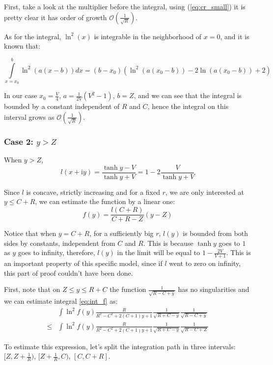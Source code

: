 \documentclass{gCOV2e}
\theoremstyle{plain}%
\theoremstyle{definition}
\theoremstyle{remark}
\begin{document}
First, take a look at the multiplier before the integral, using (\ref{eq:cr_small}) it is pretty clear it has order of growth $\mathcal{O}\left(\frac{1}{\sqrt{R}}\right)$.

As for the integral, $\ln^2(x)$ is integrable in the neighborhood of $x = 0$, and it is known that: %

\[
\int\limits_{x=x_0}^b \ln^2(a (x - b)) dx = (b - x_0) (\ln^2(a (x_0 - b)) - 2 \ln(a (x_0 - b)) + 2)
\]

In our case $x_0 = \frac{V}{4}$, $a = \frac{1}{2 V}(V^2 - 1)$, $b = Z$, and we can see that the integral is bounded by a constant independent of $R$ and $C$, hence the integral on this interval grows as $\mathcal{O}(\frac{1}{\sqrt{R}})$.

\subsubsection{Case 2: $y > Z$}
When $y > Z$, 
\[
l(x + \mathrm{i} y) 
 = \frac{\tanh y - V}{\tanh y + V}
 = 1 - 2 \frac{V}{\tanh y + V}
\]


Since $l$ is concave, strictly increasing and for a fixed $r$, we are only interested at $y \le C + R$, we can estimate the function by a linear one: 
\[
f(y) = \frac{l(C + R)}{C + R - Z} (y - Z)
\]

Notice that when $y = C + R$, for a sufficiently big $r$, $l(y)$ is bounded from both sides by constants, independent from $C$ and $R$. This is because $\tanh y$ goes to $1$ as $y$ goes to infinity, therefore, $l(y)$ in the limit will be equal to $1 - \frac{2 V}{V + 1}$. This is an important property of this specific model, since if $l$ went to zero on infinity, this part of proof couldn't have been done.

First, note that on $Z \le y \le R + C$ the function $\frac{1}{\sqrt{R - C + y}}$ has no singularities and we can estimate integral \ref{eq:int_f} as:
\begin{equation}\label{eq:int_f_up}
\begin{aligned}
       & \int \ln^2 f(y) \frac{R}{R^2 - C^2 + 2 (C + 1) y + 1} \frac{1}{\sqrt{R + C - y}} \frac{1}{\sqrt{R - C + y}}
\\ \le & \int \ln^2 f(y) \frac{R}{R^2 - C^2 + 2 (C + 1) y + 1} \frac{1}{\sqrt{R + C - y}} \frac{1}{\sqrt{R - C + Z}} 
\end{aligned}
\end{equation}

To estimate this expression, let's split the integration path in three intervals: $[Z, Z + \frac{1}{R})$, $[Z + \frac{1}{R}, C)$, $[C, C + R]$.
\end{document}
